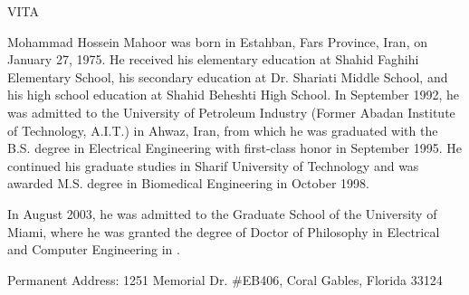 \newpage
\thispagestyle{empty}
\vspace*{0.2in}
\begin{center}
VITA
\end{center}

\vspace*{0.2in} Mohammad Hossein Mahoor was born in Estahban, Fars
Province, Iran, on January 27, 1975. He received his elementary
education at Shahid Faghihi Elementary School, his secondary
education at Dr. Shariati Middle School, and his high school
education at Shahid Beheshti High School. In September 1992, he was
admitted to the University of Petroleum Industry (Former Abadan
Institute of Technology, A.I.T.) in Ahwaz, Iran, from which he was
graduated with the B.S. degree in Electrical Engineering with
first-class honor in September 1995. He continued his graduate
studies in Sharif University of Technology and was awarded M.S.
degree in Biomedical Engineering in October 1998.

\vspace*{0.2in} In August 2003, he was admitted to the Graduate
School of the University of Miami, where he was granted the degree
of Doctor of Philosophy in Electrical and Computer Engineering in
\mydate.

\vspace*{0.5in} \noindent Permanent Address: 1251 Memorial Dr.
\#EB406, Coral Gables, Florida 33124
